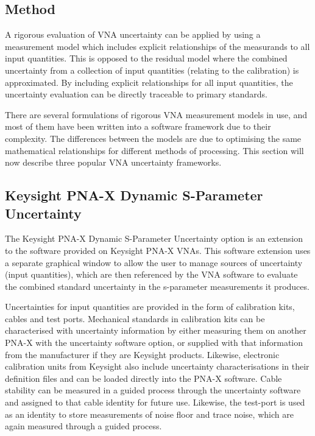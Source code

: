 \documentclass[../thesis/thesis.tex]{subfiles}
\begin{document}
\begin{refsection}
\subsection{Method}

A rigorous evaluation of VNA uncertainty can be applied by using a measurement model which includes explicit relationships of the measurands to all input quantities. This is opposed to the residual model where the combined uncertainty from a collection of input quantities (relating to the calibration) is approximated. By including explicit relationships for all input quantities, the uncertainty evaluation can be directly traceable to primary standards.

There are several formulations of rigorous VNA measurement models in use, and most of them have been written into a software framework due to their complexity. The differences between the models are due to optimising the same mathematical relationships for different methods of processing. This section will now describe three popular VNA uncertainty frameworks.

\subsection{Keysight PNA-X Dynamic S-Parameter Uncertainty}

The Keysight PNA-X Dynamic S-Parameter Uncertainty option is an extension to the software provided on Keysight PNA-X VNAs. This software extension uses a separate graphical window to allow the user to manage sources of uncertainty (input quantities), which are then referenced by the VNA software to evaluate the combined standard uncertainty in the s-parameter measurements it produces.

Uncertainties for input quantities are provided in the form of calibration kits, cables and test ports. Mechanical standards in calibration kits can be characterised with uncertainty information by either measuring them on another PNA-X with the uncertainty software option, or supplied with that information from the manufacturer if they are Keysight products. Likewise, electronic calibration units from Keysight also include uncertainty characterisations in their definition files and can be loaded directly into the PNA-X software. Cable stability can be measured in a guided process through the uncertainty software and assigned to that cable identity for future use. Likewise, the test-port is used as an identity to store measurements of noise floor and trace noise, which are again measured through a guided process.


\end{refsection}
\end{document}
